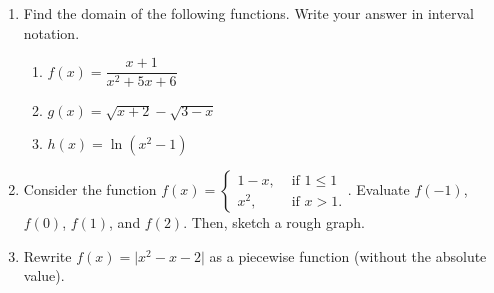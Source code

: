 \documentclass[12pt]{article}
\newcommand{\abs}[1]{\lvert #1\rvert}
\begin{document}
  \begin{enumerate}
    \item Find the domain of the following functions. Write your answer in interval notation.
  \begin{multicols}{3}
  \begin{enumerate}
  \item $f(x) = \dfrac{x+1}{x^2+5x+6}$
  \item $g(x) = \sqrt{x+2}-\sqrt{3-x}$
  \item $h(x) = \ln(x^2-1)$
  \end{enumerate}
  \end{multicols}
  
  \vspace{2in}
  

  
   
  \item Consider the function $f(x) = \begin{cases}1-x, & \text{ if } 1\leq 1\\ x^2, & \text{ if } x>1.\end{cases}$. Evaluate $f(-1)$, $f(0)$, $f(1)$, and $f(2)$. Then, sketch a rough graph.
  
  \vspace{2.5in}
  
  \item Rewrite $f(x) = \abs{x^2-x-2}$ as a piecewise function (without the absolute value).
  \end{enumerate}


  
\end{document}
